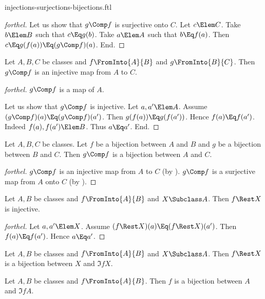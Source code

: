 \documentclass{stex}
\begin{document}
\begin{smodule}{injections-surjections-bijections.ftl}
\begin{proof}[forthel]
  Let us show that $g \Comp f$ is surjective onto $C$.
    Let $c \Elem C$.
    Take $b \Elem B$ such that $c \Eq g(b)$.
    Take $a \Elem A$ such that $b \Eq f(a)$.
    Then $c \Eq g(f(a)) \Eq (g \Comp f)(a)$.
  End.
\end{proof}

\begin{proposition*}[forthel,name=injectivity of composition of injections]
  Let $A, B, C$ be classes and $f \FromInto{A}{B}$ and $g \FromInto{B}{C}$.
  Then $g \Comp f$ is an injective map from $A$ to $C$.
\end{proposition*}
\begin{proof}[forthel]
  $g \Comp f$ is a map of $A$.

  Let us show that $g \Comp f$ is injective.
    Let $a, a' \Elem A$.
    Assume $(g \Comp f)(a) \Eq (g \Comp f)(a')$.
    Then $g(f(a)) \Eq g(f(a'))$.
    Hence $f(a) \Eq f(a')$.
    Indeed $f(a), f(a') \Elem B$.
    Thus $a \Eq a'$.
  End.
\end{proof}

\begin{proposition*}[forthel,name=bijectivity of composition of bijections]
  Let $A, B, C$ be classes.
  Let $f$ be a bijection between $A$ and $B$ and $g$ be a bijection between $B$ and $C$.
  Then $g \Comp f$ is a bijection between $A$ and $C$.
\end{proposition*}
\begin{proof}[forthel]
  $g \Comp f$ is an injective map from $A$ to $C$ (by ).
  $g \Comp f$ is a surjective map from $A$ onto $C$ (by ).
\end{proof}

\begin{proposition*}[forthel]
  Let $A, B$ be classes and $f \FromInto{A}{B}$ and $X \Subclass A$.
  Then $f \Rest X$ is injective.
\end{proposition*}
\begin{proof}[forthel]
  Let $a, a' \Elem X$.
  Assume $(f \Rest X)(a) \Eq (f \Rest X)(a')$.
  Then $f(a) \Eq f(a')$.
  Hence $a \Eq a'$.
\end{proof}

\begin{proposition*}[forthel,name=bijectivity of restriction of injection]
  Let $A, B$ be classes and $f \FromInto{A}{B}$ and $X \Subclass A$.
  Then $f \Rest X$ is a bijection between $X$ and $\Im{f}{X}$.
\end{proposition*}

\begin{proposition*}[forthel]
  Let $A, B$ be classes and $f \FromInto{A}{B}$.
  Then $f$ is a bijection between $A$ and $\Im{f}{A}$.
\end{proposition*}

\end{smodule}
\end{document}
